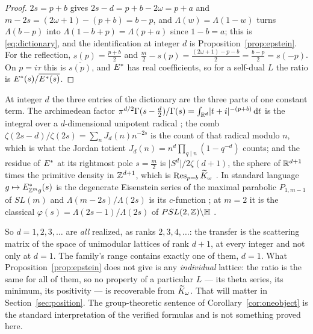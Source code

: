 \begin{proof}
$2s=p+b$ gives $2s-d=p+b-2\omega=p+a$ and $m-2s=(2\omega+1)-(p+b)=b-p$, and
$\Lambda(w)=\Lambda(1-w)$ turns $\Lambda(b-p)$ into $\Lambda(1-b+p)=\Lambda(p+a)$
since $1-b=a$; this is \eqref{eq:dictionary}, and the identification at integer
$d$ is Proposition~\ref{prop:epstein}. For the reflection,
$s(p)=\frac{p+b}2$ and
$\frac m2-s(p)=\frac{(2\omega+1)-p-b}2=\frac{b-p}2=s(-p)$. On $p=i\tau$ this is
$\overline{s(p)}$, and $E^{*}$ has real coefficients, so for a self-dual $L$ the
ratio is $E^{*}(s)/\overline{E^{*}(s)}$.
\end{proof}

\begin{corollary}\label{cor:oneobject}
At integer $d$ the three entries of the dictionary are the three parts of one
constant term. The archimedean factor
$\pi^{d/2}\Gamma(s-\frac d2)/\Gamma(s)=\int_{\mathbb R^{d}}\lvert t+i\rvert^{-(p+b)}\,\mathrm d t$
is the integral over a $d$-dimensional unipotent radical \cite{HalfDimension};
the comb $\zeta(2s-d)/\zeta(2s)=\sum_nJ_d(n)n^{-2s}$ is the count of that radical
modulo $n$, which is what the Jordan totient
$J_d(n)=n^{d}\prod_{q\mid n}(1-q^{-d})$ counts; and the residue of $E^{*}$ at its
rightmost pole $s=\frac m2$ is $\lvert S^{d}\rvert/2\zeta(d+1)$, the sphere of
$\mathbb R^{d+1}$ times the primitive density in $\mathbb Z^{d+1}$, which is
$\operatorname{Res}_{p=b}\widetilde K_\omega$ \cite{WhichDimension}. In standard language
$g\mapsto E^{*}_{\mathbb Z^{m}g}(s)$ is the degenerate Eisenstein series of the maximal
parabolic $P_{1,m-1}$ of $SL(m)$ and $\Lambda(m-2s)/\Lambda(2s)$ is its
$c$-function \cite{Terras}; at $m=2$ it is the classical
$\varphi(s)=\Lambda(2s-1)/\Lambda(2s)$ of $PSL(2,\mathbb Z)\backslash\mathbb H$
\cite{Iwaniec,LaxPhillips}.
\end{corollary}

\begin{remark}\label{rem:rankreading}
So $d=1,2,3,\dots$ are \emph{all} realized, as ranks $2,3,4,\dots$: the transfer
is the scattering matrix of the space of unimodular lattices of rank $d+1$, at
every integer and not only at $d=1$. The family's range contains exactly one of
them, $d=1$. What Proposition~\ref{prop:epstein} does not give is any
\emph{individual} lattice: the ratio is the same for all of them, so no property
of a particular $L$ --- its theta series, its minimum, its positivity --- is
recoverable from $\widetilde K_\omega$. That will matter in
Section~\ref{sec:position}. The group-theoretic sentence of
Corollary~\ref{cor:oneobject} is the standard interpretation of the verified
formulas and is not something proved here.
\end{remark}
